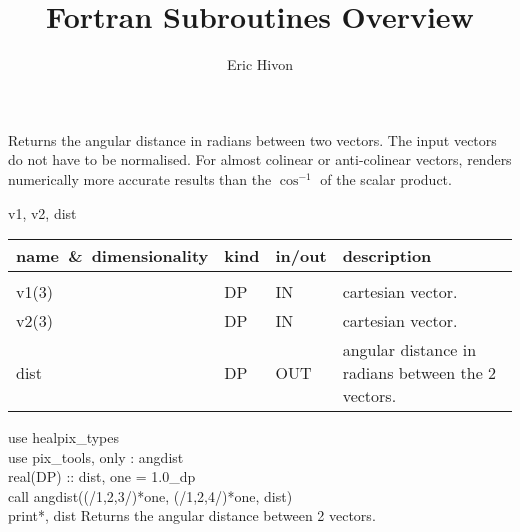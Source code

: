
\sloppy


\title{\healpix Fortran Subroutines Overview}
 \section[angdist]{ }
\label{sub:angdist}
\author{Eric Hivon}

\begin{facility}
{Returns the angular distance in radians between two vectors. The input vectors
do not have to be normalised. For almost colinear or anti-colinear vectors, renders
numerically more accurate results than the $\cos^{-1}$ of the scalar product.} 
{\modPixTools}
\end{facility}

\begin{f90format}
{v1, v2, dist}
\end{f90format}

\begin{arguments}
{
\begin{tabular}{p{0.3\hsize} p{0.05\hsize} p{0.1\hsize} p{0.45\hsize}} \hline 
\textbf{name~\&~dimensionality} & \textbf{kind} & \textbf{in/out} & \textbf{description} \\ \hline
                   &   &   &                           \\ %
v1(3) & DP & IN & cartesian vector. \\
v2(3) & DP & IN & cartesian vector. \\
dist & DP & OUT & angular distance in radians between the 2 vectors.
\end{tabular}
}
\end{arguments}

\begin{example}
{
use healpix\_types \\
use pix\_tools,    only : angdist \\
real(DP) :: dist, one = 1.0\_dp \\
call angdist((/1,2,3/)*one, (/1,2,4/)*one, dist)  \\
print*, dist
}
{
Returns the angular distance between 2 vectors.
}
\end{example}

